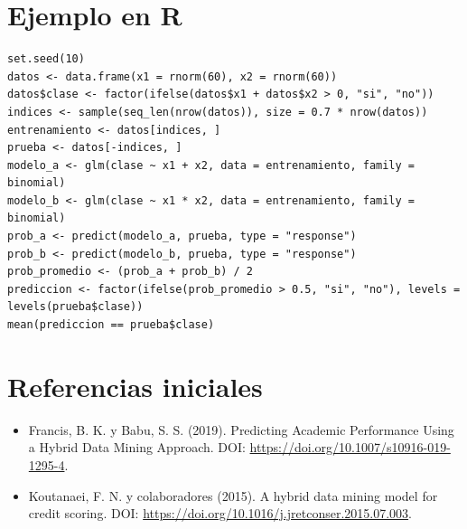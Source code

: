 \documentclass[12pt,a4paper]{article}
\begin{document}
\section{Ejemplo en R}
\begin{lstlisting}
set.seed(10)
datos <- data.frame(x1 = rnorm(60), x2 = rnorm(60))
datos$clase <- factor(ifelse(datos$x1 + datos$x2 > 0, "si", "no"))
indices <- sample(seq_len(nrow(datos)), size = 0.7 * nrow(datos))
entrenamiento <- datos[indices, ]
prueba <- datos[-indices, ]
modelo_a <- glm(clase ~ x1 + x2, data = entrenamiento, family = binomial)
modelo_b <- glm(clase ~ x1 * x2, data = entrenamiento, family = binomial)
prob_a <- predict(modelo_a, prueba, type = "response")
prob_b <- predict(modelo_b, prueba, type = "response")
prob_promedio <- (prob_a + prob_b) / 2
prediccion <- factor(ifelse(prob_promedio > 0.5, "si", "no"), levels = levels(prueba$clase))
mean(prediccion == prueba$clase)
\end{lstlisting}
\section{Referencias iniciales}
\begin{itemize}
\item Francis, B. K. y Babu, S. S. (2019). Predicting Academic Performance Using a Hybrid Data Mining Approach. DOI: \url{https://doi.org/10.1007/s10916-019-1295-4}.
\item Koutanaei, F. N. y colaboradores (2015). A hybrid data mining model for credit scoring. DOI: \url{https://doi.org/10.1016/j.jretconser.2015.07.003}.
\end{itemize}
\end{document}
